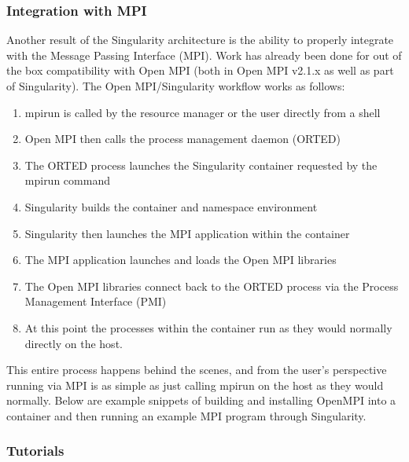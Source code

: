 \documentclass[letterpaper,10pt,english]{sphinxmanual}
\begin{document}
\subsubsection{Integration with MPI}
\label{\detokenize{installation_environments:integration-with-mpi}}
Another result of the Singularity architecture is the ability to
properly integrate with the Message Passing Interface (MPI). Work has
already been done for out of the box compatibility with Open MPI (both
in Open MPI v2.1.x as well as part of Singularity). The Open
MPI/Singularity workflow works as follows:
\begin{enumerate}
\item {} 
mpirun is called by the resource manager or the user directly from a
shell

\item {} 
Open MPI then calls the process management daemon (ORTED)

\item {} 
The ORTED process launches the Singularity container requested by the
mpirun command

\item {} 
Singularity builds the container and namespace environment

\item {} 
Singularity then launches the MPI application within the container

\item {} 
The MPI application launches and loads the Open MPI libraries

\item {} 
The Open MPI libraries connect back to the ORTED process via the
Process Management Interface (PMI)

\item {} 
At this point the processes within the container run as they would
normally directly on the host.

\end{enumerate}

This entire process happens behind the scenes, and from the user’s
perspective running via MPI is as simple as just calling mpirun on the
host as they would normally.
Below are example snippets of building and installing OpenMPI into a
container and then running an example MPI program through Singularity.


\subsubsection{Tutorials}
\label{\detokenize{installation_environments:tutorials}}
{\hyperref[\detokenize{appendix:using-host-libraries-gpu-drivers-and-openmpi-btls}]{}}
\end{document}

